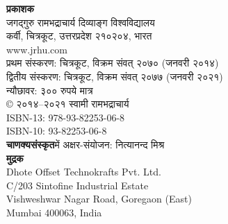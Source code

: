 \documentclass[twoside]{book}
\begin{document}
\begin{titlepage}
\thispagestyle{empty}
\begin{center}
\vspace*{3.5mm}
{\fontsize{15}{22.5}\selectfont \textbf{प्रकाशक}}\\
\vspace*{1.25mm}
{\fontsize{15}{22.5}\selectfont जगद्गुरु रामभद्राचार्य  दिव्याङ्ग विश्वविद्यालय}\\
\vspace*{0.5mm}
{\fontsize{15}{22.5}\selectfont कर्वी, चित्रकूट, उत्तरप्रदेश २१०२०४, भारत}\\
\vspace*{0.5mm}
{\englishfont \fontsize{11}{22.5}\selectfont www.jrhu.com}\\
\vfill
{\fontsize{15}{22.5}\selectfont प्रथम संस्करण: चित्रकूट, विक्रम संवत् २०७० (जनवरी २०१४)}\\
\vspace*{1mm}
{\fontsize{15}{22.5}\selectfont द्वितीय संस्करण: चित्रकूट, विक्रम संवत् २०७७ (जनवरी २०२१)}\\
\vfill
{\fontsize{15}{22.5}\selectfont न्यौछावर: ३०० रुपये मात्र}\\
\vfill
{\englishfont \fontsize{12}{13}\selectfont © }{\fontsize{15}{17.5}\selectfont २०१४–२०२१ स्वामी रामभद्राचार्य}\\
\vfill
{\englishfont \fontsize{11}{13}\selectfont ISBN-13: 978-93-82253-06-8}\\
\vspace*{2.5mm}
{\englishfont \fontsize{11}{13}\selectfont ISBN-10: 93-82253-06-8}\\
\vfill
\vfill
{\fontsize{15}{17.5}\selectfont \textbf{चाणक्यसंस्कृत}में %
 अक्षर-संयोजन: नित्यानन्द मिश्र}\\
\vfill
{\fontsize{15}{17.5}\selectfont \textbf{मुद्रक}}\\{\englishfont \fontsize{11}{15}\selectfont Dhote Offset Technokrafts Pvt. Ltd.\\C/203 Sintofine Industrial Estate\\Vishweshwar Nagar Road, Goregaon (East)\\Mumbai 400063, India\\}
\vspace*{3.5mm}
\end{center}
\end{titlepage}

\mbox{}
\thispagestyle{empty}
\newpage
\mbox{}
\thispagestyle{empty}
\newpage


\end{document}
